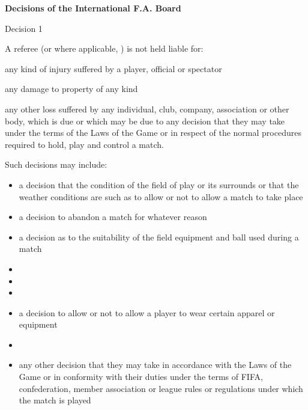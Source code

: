 \clearpage
{\bfseries Decisions of the International F.A. Board }

\headlinebox

Decision 1

A  referee (or where applicable,  ) is not held liable for:

any kind of injury suffered by a player, official or spectator

any damage to property of any kind

any other loss suffered by any individual, club, company, association or other body, which is due or which may be due to any decision that they may take under the terms of the Laws of the Game or in respect of the normal procedures required to hold, play and control a match.

\bigskip

Such decisions may include:

\begin{itemize}
\item a decision that the condition of the field of play or its surrounds or that the weather conditions are such as to allow or not to allow a match to take place
\item a decision to abandon a match for whatever reason
\item a decision as to the suitability of the field equipment and ball used during a match
\item {}
\item {}
\item {} 
\item a decision to allow or not to allow a player to wear certain apparel or equipment 
\item {}
\item any other decision that they may take in accordance with the Laws of the Game or in conformity with their duties under the terms of FIFA, confederation, member association or league rules or regulations under which the match is played 
\end{itemize}

